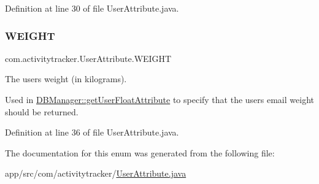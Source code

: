 Definition at line 30 of file User\+Attribute.\+java.

\mbox{\label{enumcom_1_1activitytracker_1_1_user_attribute_a024206b0dc3261031ef586b3f0fd530c}} 
\subsubsection{\texorpdfstring{W\+E\+I\+G\+HT}{WEIGHT}}
{\footnotesize\ttfamily com.\+activitytracker.\+User\+Attribute.\+W\+E\+I\+G\+HT}

The user\textquotesingle{}s weight (in kilograms).

Used in \mbox{\hyperlink{classcom_1_1activitytracker_1_1_d_b_manager_a98df66254bec4d74b29cfe468a9fc794}{D\+B\+Manager\+::get\+User\+Float\+Attribute}} to specify that the user\textquotesingle{}s email weight should be returned. 

Definition at line 36 of file User\+Attribute.\+java.



The documentation for this enum was generated from the following file\+:\begin{DoxyCompactItemize}
\item 
app/src/com/activitytracker/\mbox{\hyperlink{_user_attribute_8java}{User\+Attribute.\+java}}\end{DoxyCompactItemize}
